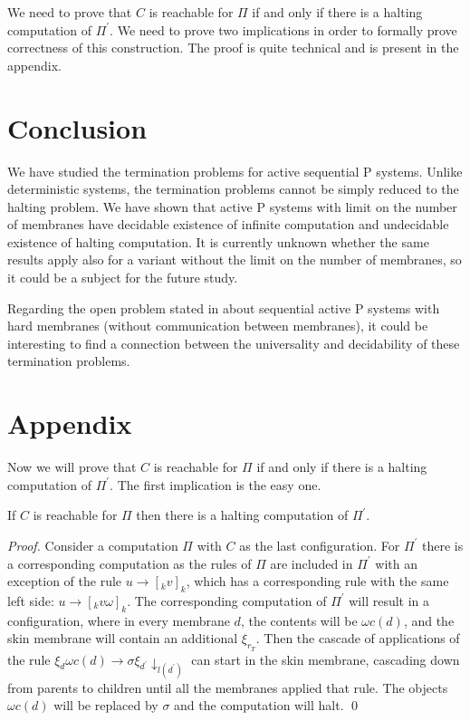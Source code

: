 \documentclass[llncs,submission,copyright,creativecommons]{../lib/lncs/llncs}
\begin{document}
We need to prove that $C$ is reachable for $\Pi$ if and only if there is a halting computation of $\Pi^\prime$. We need to prove two implications in order to formally prove correctness of this construction. The proof is quite technical and is present in the appendix.



\section{Conclusion}
\label{sec:conclusion}
We have studied the termination problems for active sequential P systems. Unlike deterministic systems, the termination problems cannot be simply reduced to the halting problem. We have shown that active P systems with limit on the number of membranes have decidable existence of infinite computation and undecidable existence of halting computation. It is currently unknown whether the same results apply also for a variant without the limit on the number of membranes, so it could be a subject for the future study.

Regarding the open problem stated in \cite{Ibarra05Active} about sequential active P systems with hard membranes (without communication between membranes), it could be interesting to find a connection between the universality and decidability of these termination problems.



\section*{Appendix} %
\label{sec:appendix}

Now we will prove that $C$ is reachable for $\Pi$ if and only if there is a halting computation of $\Pi^\prime$. The first implication is the easy one.

\begin{lemma}
\label{if_reachable_then_halting_lemma}
  If $C$ is reachable for $\Pi$ then there is a halting computation of $\Pi^\prime$.
\end{lemma}

\begin{proof}
  Consider a computation $\Pi$ with $C$ as the last configuration. For $\Pi^\prime$ there is a corresponding computation as the rules of $\Pi$ are included in $\Pi^\prime$ with an exception of the rule $u\rightarrow [_k v]_k$, which has a corresponding rule with the same left side: $u\rightarrow [_k v\omega]_k$. The corresponding computation of $\Pi^\prime$ will result in a configuration, where in every membrane $d$, the contents will be $\omega c(d)$, and the skin membrane will contain an additional $\xi_{r_T}$. Then the cascade of applications of the rule $\xi_d\omega c(d)\rightarrow\sigma\xi_{d^\prime}\downarrow_{l(d^\prime)}$ can start in the skin membrane, cascading down from parents to children until all the membranes applied that rule. The objects $\omega c(d)$ will be replaced by $\sigma$ and the computation will halt. \qed
\end{proof}
\end{document}
